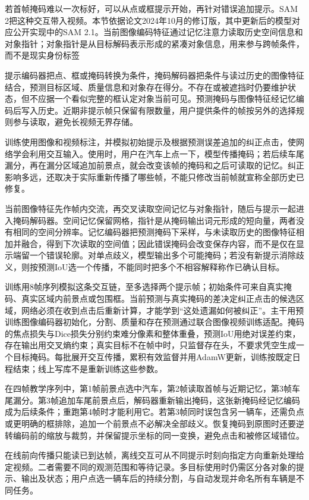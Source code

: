 若首帧掩码难以一次标好，可以从点或框提示开始，再针对错误追加提示。SAM 2把这种交互带入视频。本节依据论文2024年10月的修订版，其中更新后的模型对应公开实现中的SAM 2.1。当前图像编码特征通过记忆注意力读取历史空间信息和对象指针；对象指针是从目标解码表示形成的紧凑对象信息，用来参与跨帧条件，而不是现实身份标签

提示编码器把点、框或掩码转换为条件，掩码解码器把条件与读过历史的图像特征结合，预测目标区域、质量信息和对象存在得分。不存在或被遮挡时仍要维护状态，但不应据一个看似完整的框认定对象当前可见。预测掩码与图像特征经记忆编码后写入历史。近期非提示帧只保留有限数量，用户提供条件的帧按另外的选择规则参与读取，避免长视频无界存储。

训练使用图像和视频标注，并模拟初始提示及根据预测误差追加的纠正点击，使网络学会利用交互输入。使用时，用户在汽车上点一下，模型传播掩码；若后续车尾漏分，再在漏分区域追加前景点，就会改变该帧的掩码和之后可读取的记忆。纠正影响多远，还取决于实际重新传播了哪些帧，不能只修改当前帧就宣称全部历史已修复。

当前图像特征先作帧内交流，再交叉读取空间记忆与对象指针，随后与提示一起进入掩码解码器。空间记忆保留网格，指针是从掩码输出词元形成的短向量，两者没有相同的空间分辨率。记忆编码器把预测掩码下采样，与未读取历史的图像特征相加并融合，得到下次读取的空间值；因此错误掩码会改变保存内容，而不是仅在显示端留一个错误轮廓。对单点歧义，模型输出多个可能掩码；若没有新提示消除歧义，则按预测IoU选一个传播，不能同时把多个不相容解释称作已确认目标。

训练用8帧序列模拟这条交互链，至多选择两个提示帧；初始条件可来自真实掩码、真实区域内前景点或包围框。当前预测与真实掩码的差决定纠正点击的候选区域，网络必须在收到点击后重新计算，才能学到“这处遗漏如何被纠正”。主干用预训练图像编码器初始化，分割、质量和存在预测通过联合图像视频训练适配。掩码的焦点损失与Dice损失分别约束难分像素和整体重叠，预测IoU用绝对误差约束，存在输出用交叉熵约束；真实目标不在帧中时，只监督存在头，不要求凭空生成一个目标掩码。每批展开交互传播，累积有效监督并用AdamW更新，训练按既定日程结束；线上写库不是重新训练这些参数。

在四帧教学序列中，第1帧前景点选中汽车，第2帧读取首帧与近期记忆，第3帧车尾漏分。第3帧追加车尾前景点后，解码器重新输出掩码，这张新掩码经记忆编码成为后续条件；重跑第4帧时才能利用它。若第3帧同时误包含另一辆车，还需负点或更明确的框排除，追加一个前景点不必解决全部歧义。恢复掩码到原图时还要逆转编码前的缩放与裁剪，并保留提示坐标的同一变换，避免点击和被修区域错位。

在线前向传播只能读已到达帧，离线交互可从不同提示时刻向指定方向重新处理给定视频。二者需要不同的观测范围和等待记录。多目标使用时仍需区分各对象的提示、输出及状态；用户点选一辆车后的持续分割，与自动发现并命名所有车辆是不同任务。

